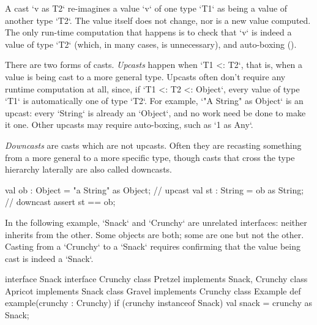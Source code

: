 A cast \xcd`v as T2` re-imagines a value \xcd`v` of one type \xcd`T1` as being
a value of another 
type \xcd`T2`.  The
value itself does not change, nor is a new value computed.  The only
run-time computation that happens is to check that \xcd`v` is indeed a value
of type \xcd`T2` (which, in many cases, is unnecessary), and auto-boxing ().

There are two forms of casts.  {\em Upcasts} happen when \xcd`T1 <: T2`, that
is, when a value is being cast to a more general type.  Upcasts often don't require
any runtime computation at all, since, if \xcd`T1 <: T2 <: Object`, every value of type
\xcd`T1` is automatically one of type \xcd`T2`.   For example, 
\xcd`"A String" as Object` is an upcast: every \xcd`String` is already an
\xcd`Object`, and no work need be done to make it one.  Other upcasts may
require auto-boxing, such as \xcd`1 as Any`.  

{\em Downcasts} are casts which are not upcasts.  Often they are recasting
something from a more general to a more specific type, 
though casts that cross the type hierarchy laterally are also called
downcasts.   
\begin{xten}
   val ob : Object = "a String" as Object; // upcast
   val st : String = ob as String;         // downcast
   assert st == ob;
\end{xten}
 

\begin{ex}

In
the following example, \xcd`Snack` and \xcd`Crunchy` are unrelated interfaces:
neither inherits from the other.  Some objects are both; some are one but not
the other.  Casting from a \xcd`Crunchy` to a \xcd`Snack` requires confirming
that the value being cast is indeed a \xcd`Snack`.  
\begin{xten}
interface Snack {}
interface Crunchy {} 
class Pretzel implements Snack, Crunchy{}
class Apricot implements Snack{}
class Gravel  implements Crunchy{}
class Example{
  def example(crunchy : Crunchy) { 
    if (crunchy instanceof Snack) { 
       val snack = crunchy as Snack; 
    } } } 
\end{xten}
%

\end{ex}


